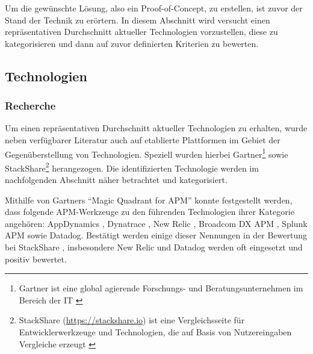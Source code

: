 
%
%

Um die gewünschte Lösung, also ein Proof-of-Concept, zu erstellen, ist zuvor der Stand der Technik zu erörtern. In diesem Abschnitt wird versucht einen repräsentativen Durchschnitt aktueller Technologien vorzustellen, diese zu kategorisieren und dann auf zuvor definierten Kriterien zu bewerten.

\subsection{Technologien}

\subsubsection{Recherche}

Um einen repräsentativen Durchschnitt aktueller Technologien zu erhalten, wurde neben verfügbarer Literatur auch auf etablierte Plattformen im Gebiet der Gegenüberstellung von Technologien. Speziell wurden hierbei Gartner\footnote{Gartner ist eine global agierende Forschungs- und Beratungsunternehmen im Bereich der IT \cite{GartnerDefinition}} sowie StackShare\footnote{StackShare (\url{https://stackshare.io}) ist eine Vergleichsseite für Entwicklerwerkzeuge und Technologien, die auf Basis von Nutzereingaben Vergleiche erzeugt \cite{StackshareDefinition}} herangezogen. Die identifizierten Technologie werden im nachfolgenden Abschnitt näher betrachtet und kategorisiert. 

Mithilfe von Gartners \enquote{Magic Quadrant for APM} \cite{GartnerMagicQuadrantForAPM} konnte festgestellt werden, dass folgende APM-Werkzeuge zu den führenden Technologien ihrer Kategorie angehören: AppDynamics \cite{AppDynamics}, Dynatrace \cite{Dynatrace}, New Relic \cite{NewRelic}, Broadcom DX APM \cite{BroadcomDXAPM}, Splunk APM \cite{SplunkAPM} sowie Datadog\cite{Datadog}. Bestätigt werden einige dieser Nennungen in der Bewertung bei StackShare \cite{StackShareAPM}, insbesondere New Relic und Datadog werden oft eingesetzt und positiv bewertet.

